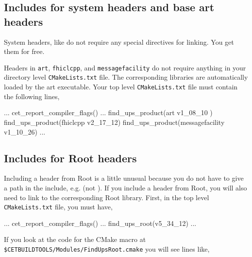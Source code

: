 \subsection{Includes for system headers and base art headers}

System headers, like  do not require any special directives for linking. You get them for free.

Headers in \texttt{art}, \texttt{fhiclcpp}, and \texttt{messagefacility} do not require anything in your directory level \texttt{CMakeLists.txt} file. The corresponding libraries are automatically loaded by the art executable. Your top level \texttt{CMakeLists.txt} file must contain the following lines,

\begin{cpplisting}
...
cet_report_compiler_flags()
...
find_ups_product(art v1_08_10 )
find_ups_product(fhiclcpp v2_17_12)
find_ups_product(messagefacility v1_10_26)
...
\end{cpplisting}

\subsection{Includes for Root headers}
\label{sec:rootincludes}

Including a header from Root is a little unusual because you do not have to give a path in the include, e.g.  (not ). If you include a header from Root, you will also need to link to the corresponding Root library. First, in the top level \texttt{CMakeLists.txt} file, you must have,

\begin{cpplisting}
...
cet_report_compiler_flags()
...
find_ups_root(v5_34_12)
...
\end{cpplisting}

If you look at the code for the  CMake macro at \\ \texttt{\$CETBUILDTOOLS/Modules/FindUpsRoot.cmake} you will see lines like,

